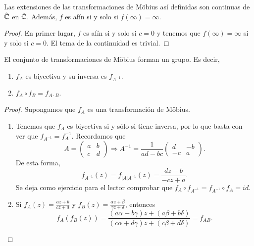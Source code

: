 \begin{prop}
 Las extensiones de las transformaciones de Möbius así definidas son continuas de $\displaystyle \hat{\mathbb{C}} $ en $\displaystyle \hat{\mathbb{C}} $. Además, $\displaystyle f $ es afín si y solo si $\displaystyle f\left(\infty \right) = \infty $.  
\end{prop}
\begin{proof}
En primer lugar, $\displaystyle f $ es afín si y solo si $\displaystyle c = 0 $ y tenemos que $\displaystyle f\left(\infty \right)= \infty  $ si y solo si $\displaystyle c = 0 $. El tema de la continuidad es trivial. 
\end{proof}

\begin{prop} El conjunto de transformaciones de Möbius forman un grupo. Es decir,
\begin{enumerate}
\item $\displaystyle f_{A} $ es biyectiva y su inversa es $\displaystyle f_{A^{-1}} $.
\item $\displaystyle f_{A}\circ f_{B} = f_{A \cdot B} $. 
\end{enumerate}
\end{prop}
\begin{proof}
Supongamos que $\displaystyle f_{A} $ es una transformación de Möbius.
\begin{enumerate}
\item Tenemos que $\displaystyle f_{A} $ es biyectiva si y sólo si tiene inversa, por lo que basta con ver que $\displaystyle f_{A^{-1}}=f_{A}^{-1} $. Recordamos que 
	\[A = \begin{pmatrix} a & b \\ c & d \end{pmatrix} \Rightarrow A^{-1}=\frac{1}{ad-bc}\begin{pmatrix} d & - b \\ - c & a \end{pmatrix} .\]
	De esta forma, 
	\[f_{A^{-1}}\left(z\right)=f_{ \left|A\right|A^{-1}}\left(z\right) = \frac{dz - b}{-cz + a}.\]
	Se deja como ejercicio para el lector comprobar que $\displaystyle f_{A}\circ f_{A^{-1}}=f_{A^{-1}}\circ f_{A}=id $. 	
\item Si $\displaystyle f_{A}\left(z\right)=\frac{az + b}{cz + d} $ y $\displaystyle f_{B}\left(z\right)=\frac{\alpha z + \beta }{\gamma z + \delta } $, entonces
	\[f_{A}\left(f_{B}\left(z\right)\right)=\frac{\left(a \alpha + b \gamma \right)z + \left(a \beta + b \delta \right)}{\left(c \alpha + d \gamma \right)z + \left(c \beta + d \delta \right)} = f_{AB} .\]
	
\end{enumerate}

\end{proof}

